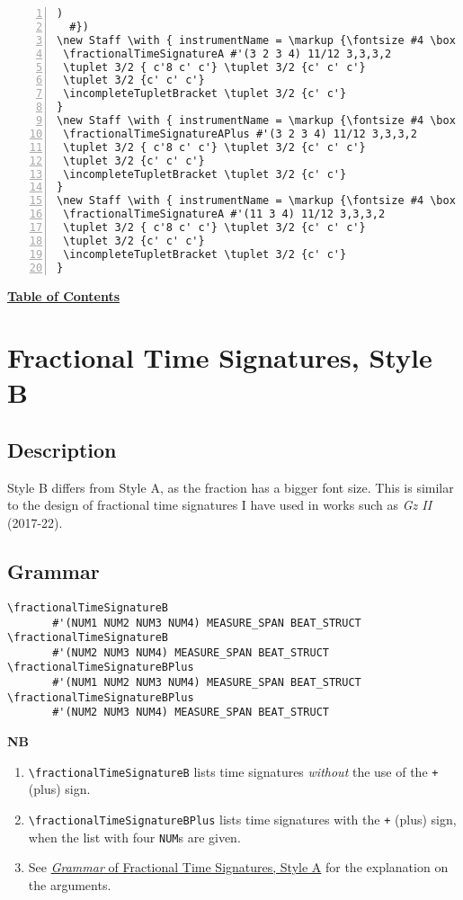 \begin{Verbatim}[numbers=left,xleftmargin=5mm]
        )
  #})
\new Staff \with { instrumentName = \markup {\fontsize #4 \box "A"}} {
 \fractionalTimeSignatureA #'(3 2 3 4) 11/12 3,3,3,2
 \tuplet 3/2 { c'8 c' c'} \tuplet 3/2 {c' c' c'}
 \tuplet 3/2 {c' c' c'}
 \incompleteTupletBracket \tuplet 3/2 {c' c'}
}
\new Staff \with { instrumentName = \markup {\fontsize #4 \box "B"}} {
 \fractionalTimeSignatureAPlus #'(3 2 3 4) 11/12 3,3,3,2
 \tuplet 3/2 { c'8 c' c'} \tuplet 3/2 {c' c' c'}
 \tuplet 3/2 {c' c' c'}
 \incompleteTupletBracket \tuplet 3/2 {c' c'}
}
\new Staff \with { instrumentName = \markup {\fontsize #4 \box "C"}} {
 \fractionalTimeSignatureA #'(11 3 4) 11/12 3,3,3,2
 \tuplet 3/2 { c'8 c' c'} \tuplet 3/2 {c' c' c'}
 \tuplet 3/2 {c' c' c'}
 \incompleteTupletBracket \tuplet 3/2 {c' c'}
}

\end{Verbatim}

\hyperref[sec:toc]{\textbf{Table of Contents}}

\vfill \break



\section {Fractional Time Signatures, Style B}

\hfill
{}
\hfill

\subsection{Description}
Style B differs from Style A, as the fraction has a bigger font size. This is similar to the design of fractional time signatures I have used in works such as \textit{Gz II} (2017-22).\autocite{RN1748}  

\subsection{Grammar}
\begin{verbatim}
\fractionalTimeSignatureB 
       #'(NUM1 NUM2 NUM3 NUM4) MEASURE_SPAN BEAT_STRUCT
\fractionalTimeSignatureB
       #'(NUM2 NUM3 NUM4) MEASURE_SPAN BEAT_STRUCT
\fractionalTimeSignatureBPlus 
       #'(NUM1 NUM2 NUM3 NUM4) MEASURE_SPAN BEAT_STRUCT
\fractionalTimeSignatureBPlus 
       #'(NUM2 NUM3 NUM4) MEASURE_SPAN BEAT_STRUCT
\end{verbatim}
\textbf{NB} 
\begin{enumerate}
\item \verb|\fractionalTimeSignatureB| lists time signatures \textit{without} the use of the \verb|+| (plus) sign. 
\item \verb|\fractionalTimeSignatureBPlus| lists time signatures with the \verb|+| (plus) sign, when the list with four \verb|NUM|s are given.
\item See \hyperref[sec:time_signatures_styleA_convention]{\textit{Grammar} of Fractional Time Signatures, Style A} for the explanation on the arguments.
\end{enumerate}
